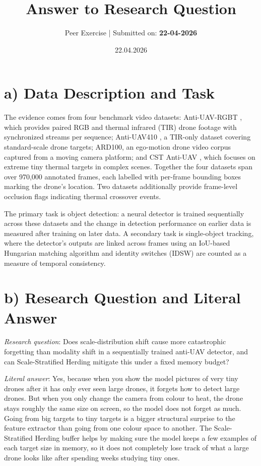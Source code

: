 \documentclass{thesisdesign}
\title{Answer to Research Question}
\subtitle{
    Peer Exercise | %
    Submitted on: \textbf{22-04-2026}
}
\date{22.04.2026}
\affiliation{
  \institution{\thesisinstitution}
  \city{\thesiscity}
  \country{\thesiscountry}
}
\begin{document}
\pagestyle{plain}
\setcounter{page}{0}
\fixemptypage
\maketitle

\section*{a) Data Description and Task}

The evidence comes from four benchmark video datasets: Anti-UAV-RGBT \cite{jiang_anti-uav_2023}, which provides paired RGB and thermal infrared (TIR) drone footage with synchronized streams per sequence; Anti-UAV410 \cite{bohuang_410}, a TIR-only dataset covering standard-scale drone targets; ARD100, an ego-motion drone video corpus captured from a moving camera platform; and CST Anti-UAV \cite{xie2025cstantiuavthermalinfrared}, which focuses on extreme tiny thermal targets in complex scenes. Together the four datasets span over 970,000 annotated frames, each labelled with per-frame bounding boxes marking the drone's location. Two datasets additionally provide frame-level occlusion flags indicating thermal crossover events.

The primary task is object detection: a neural detector is trained sequentially across these datasets and the change in detection performance on earlier data is measured after training on later data. A secondary task is single-object tracking, where the detector's outputs are linked across frames using an IoU-based Hungarian matching algorithm and identity switches (IDSW) are counted as a measure of temporal consistency.

\section*{b) Research Question and Literal Answer}

\textit{Research question}: Does scale-distribution shift cause more catastrophic forgetting than modality shift in a sequentially trained anti-UAV detector, and can Scale-Stratified Herding mitigate this under a fixed memory budget?

\textit{Literal answer}: Yes, because when you show the model pictures of very tiny drones after it has only ever seen large drones, it forgets how to detect large drones. But when you only change the camera from colour to heat, the drone stays roughly the same size on screen, so the model does not forget as much. Going from big targets to tiny targets is a bigger structural surprise to the feature extractor than going from one colour space to another. The Scale-Stratified Herding buffer helps by making sure the model keeps a few examples of each target size in memory, so it does not completely lose track of what a large drone looks like after spending weeks studying tiny ones.
\end{document}
